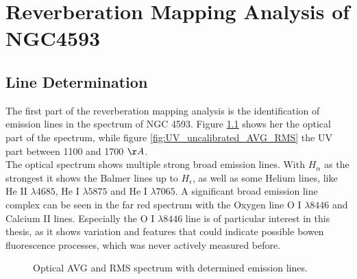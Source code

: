 \chapter{Reverberation Mapping Analysis of NGC4593}
\label{cap: Results}

\section{Line Determination}

 The first part of the reverberation mapping analysis is the identification of emission lines in the spectrum of NGC 4593. Figure \ref{fig:AVG_RMS_SPECTRUM} shows her the optical part of the spectrum, while figure \ref{fig:UV_uncalibrated_AVG_RMS} the UV part between 1100 and 1700 $\AA$. \\
 The optical spectrum shows multiple strong broad emission lines. With $H_\alpha$ as the strongest it shows the Balmer lines up to $H_\epsilon$, as well as some Helium lines, like He II $\lambda 4685$, He I $\lambda 5875$ and He I $\lambda 7065$. A significant broad emission line complex can be seen in the far red spectrum with the Oxygen line O I $\lambda 8446$ and Calcium II lines. Especially the O I $\lambda 8446$ line is of particular interest in this thesis, as it shows variation and features that could indicate possible bowen fluorescence processes, which was never actively measured before.\\
 
 
\begin{figure}[!htbp]
	\centering
	\caption{Optical AVG and RMS spectrum with determined emission lines.}
	\label{fig:AVG_RMS_SPECTRUM}
\end{figure}

